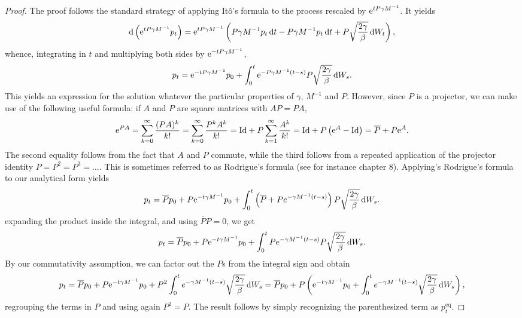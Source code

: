 \begin{proof}
    The proof follows the standard strategy of applying Itô's formula to the process rescaled by $\mathrm{e}^{tP\gamma M^{-1}}$. It yields
    \begin{equation}
        \mathrm{d} \left(\mathrm{e}^{tP\gamma M^{-1}} p_t\right)=\mathrm{e}^{tP\gamma M^{-1}}\left(P\gamma M^{-1} p_t\,\mathrm{d} t - P\gamma M^{-1}p_t \,\mathrm{d} t+ P\sqrt{\frac{2\gamma}{\beta}}\,\mathrm{d} W_t\right),
    \end{equation}
    whence, integrating in $t$ and multiplying both sides by $\mathrm{e}^{-tP\gamma M^{-1}}$,
    \begin{equation}
        p_t = \mathrm{e}^{-tP\gamma M^{-1}}p_0 +\int_0^t \mathrm{e}^{-P\gamma M^{-1}(t-s)}P\sqrt{\frac{2\gamma}{\beta}}\,\mathrm{d} W_s.
    \end{equation}
    This yields an expression for the solution whatever the particular properties of $\gamma$, $M^{-1}$ and $P$. However, since $P$ is a projector, we can make use of the following useful formula: if $A$ and $P$ are square matrices with $AP=PA$, 
    \begin{equation}
        \label{eq:rodrigue_formula}
        \mathrm{e}^{PA}=\sum_{k=0}^\infty \frac{(PA)^k}{k!}=\sum_{k=0}^\infty \frac{P^kA^k}{k!}=\mathrm{Id} + P\sum_{k=1}^\infty \frac{A^k}{k!}=\mathrm{Id} + P\left(\mathrm{e}^A -\mathrm{Id}\right)= \overline{P}+P\mathrm{e}^A.
    \end{equation}
    The second equality follows from the fact that $A$ and $P$ commute, while the third follows from a repeated application of the projector identity $P=P^2=P^3=\dots$. This is sometimes referred to as Rodrigue's formula (see for instance \cite{LM15}{chapter 8}).
    Applying's Rodrigue's formula to our analytical form yields
    \begin{equation}
        p_t = \overline{P}p_0 +P\mathrm{e}^{-t\gamma M^{-1}}p_0 +\int_0^t \left(\overline{P}+ Pe^{-\gamma M^{-1}(t-s)}\right)P\sqrt{\frac{2\gamma}{\beta}}\,\mathrm{d} W_s.
    \end{equation}
    expanding the product inside the integral, and using $\overline P P=0$, we get 
    \begin{equation}
        p_t = \overline{P}p_0 +P\mathrm{e}^{-t\gamma M^{-1}}p_0 +\int_0^t Pe^{-\gamma M^{-1}(t-s)}P\sqrt{\frac{2\gamma}{\beta}}\,\mathrm{d} W_s.
    \end{equation}
    By our commutativity assumption, we can factor out the $P$s from the integral sign  and obtain
    \begin{equation}
        p_t = \overline{P}p_0 +P\mathrm{e}^{-t\gamma M^{-1}}p_0 +P^2\int_0^t e^{-\gamma M^{-1}(t-s)}\sqrt{\frac{2\gamma}{\beta}}\,\mathrm{d} W_s= \overline{P}p_0 +P\left(\mathrm{e}^{-t\gamma M^{-1}}p_0 +\int_0^t e^{-\gamma M^{-1}(t-s)}\sqrt{\frac{2\gamma}{\beta}}\,\mathrm{d} W_s\right),
    \end{equation} 
    regrouping the terms in $P$ and using again $P^2=P$. The result follows by simply recognizing the parenthesized term as $p_t^{\mathrm{eq}}$.
\end{proof}
